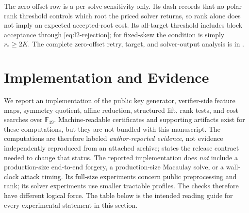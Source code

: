 \documentclass[11pt]{article}
\newcommand{\F}{\mathbb F}
\begin{document}
The zero-offset row is a per-solve sensitivity only.  Its dash records that no
polar-rank threshold controls which root the priced solver returns, so rank
alone does not imply an expected accepted-root cost.  Its all-target threshold
includes block acceptance through \eqref{eq:l2-rejection}; for fixed-skew the
condition is simply $r_*\ge2K$.  The complete zero-offset retry, target,
and solver-output analysis is in .

\section{Implementation and Evidence}\label{sec:evidence}

We report an implementation of the public key generator, verifier-side feature
maps, symmetry quotient, affine reduction, structured lift, rank tests, and
cost searches over $\F_{19}$.  Machine-readable certificates and supporting
artifacts exist for these computations, but they are not bundled with this
manuscript.  The computations are therefore labeled
\emph{author-reported evidence}, not evidence independently reproduced from an
attached archive;  states
the release contract needed to change that status.  The reported implementation does \emph{not} include a production-size
end-to-end forgery, a production-size Macaulay solve, or a wall-clock attack
timing.  Its full-size experiments concern public preprocessing and rank; its
solver experiments use smaller tractable profiles.  The checks therefore have
different logical force.  The table
below is the intended reading guide for every experimental statement in this
section.
\end{document}
